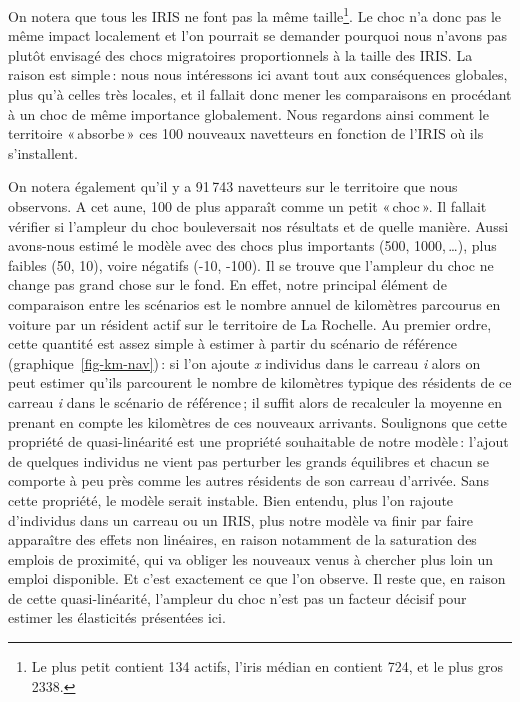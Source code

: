 \documentclass[
  9pt,
  a4paper,
  DIV=11]{scrreprt}
\begin{document}
On notera que tous les IRIS ne font pas la même taille\footnote{Le plus
  petit contient 134 actifs, l'iris médian en contient 724, et le plus
  gros 2338.}. Le choc n'a donc pas le même impact localement et l'on
pourrait se demander pourquoi nous n'avons pas plutôt envisagé des chocs
migratoires proportionnels à la taille des IRIS. La raison est simple\,:
nous nous intéressons ici avant tout aux conséquences globales, plus
qu'à celles très locales, et il fallait donc mener les comparaisons en
procédant à un choc de même importance globalement. Nous regardons ainsi
comment le territoire «\,absorbe\,» ces 100 nouveaux navetteurs en
fonction de l'IRIS où ils s'installent.

On notera également qu'il y a 91\,743 navetteurs sur le territoire que
nous observons. A cet aune, 100 de plus apparaît comme un petit
«\,choc\,». Il fallait vérifier si l'ampleur du choc bouleversait nos
résultats et de quelle manière. Aussi avons-nous estimé le modèle avec
des chocs plus importants (500, 1000,\,\ldots), plus faibles (50, 10),
voire négatifs (-10, -100). Il se trouve que l'ampleur du choc ne change
pas grand chose sur le fond. En effet, notre principal élément de
comparaison entre les scénarios est le nombre annuel de kilomètres
parcourus en voiture par un résident actif sur le territoire de La
Rochelle. Au premier ordre, cette quantité est assez simple à estimer à
partir du scénario de référence (graphique~\ref{fig-km-nav})\,: si l'on
ajoute \emph{x} individus dans le carreau \emph{i} alors on peut estimer
qu'ils parcourent le nombre de kilomètres typique des résidents de ce
carreau \emph{i} dans le scénario de référence\,; il suffit alors de
recalculer la moyenne en prenant en compte les kilomètres de ces
nouveaux arrivants. Soulignons que cette propriété de quasi-linéarité
est une propriété souhaitable de notre modèle\,: l'ajout de quelques
individus ne vient pas perturber les grands équilibres et chacun se
comporte à peu près comme les autres résidents de son carreau d'arrivée.
Sans cette propriété, le modèle serait instable. Bien entendu, plus l'on
rajoute d'individus dans un carreau ou un IRIS, plus notre modèle va
finir par faire apparaître des effets non linéaires, en raison notamment
de la saturation des emplois de proximité, qui va obliger les nouveaux
venus à chercher plus loin un emploi disponible. Et c'est exactement ce
que l'on observe. Il reste que, en raison de cette quasi-linéarité,
l'ampleur du choc n'est pas un facteur décisif pour estimer les
élasticités présentées ici.
\end{document}

